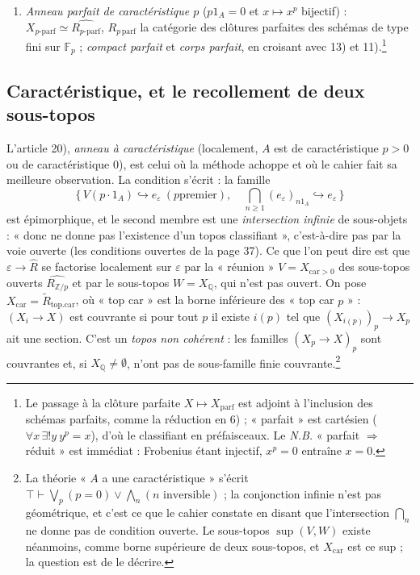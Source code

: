 \documentclass[11pt,a4paper]{article}
\begin{document}
\begin{enumerate}
\item[17)--19)] \emph{Anneau parfait de caractéristique $p$} ($p1_{A} = 0$
et $x \mapsto x^{p}$ bijectif) : $X_{p\text{-parf}} \simeq \widehat{R_{p\text{-parf}}}$,
$R_{p\,\mathrm{parf}}$ la catégorie des clôtures parfaites des schémas de
type fini sur $\mathbb{F}_{p}$ ; \emph{compact parfait} et \emph{corps
parfait}, en croisant avec 13) et 11).\footnote{Le passage à la clôture
parfaite $X \mapsto X_{\mathrm{parf}}$ est adjoint à l'inclusion des schémas
parfaits, comme la réduction en 6) ; « parfait » est cartésien
($\forall x\, \exists! y\ y^{p} = x$), d'où le classifiant en préfaisceaux.
Le \emph{N.B.} « parfait $\Rightarrow$ réduit » est immédiat : Frobenius
étant injectif, $x^{p} = 0$ entraîne $x = 0$.}
\end{enumerate}

\subsection*{Caractéristique, et le recollement de deux sous-topos}

L'article 20), \emph{anneau à caractéristique} (localement, $A$ est de
caractéristique $p > 0$ ou de caractéristique $0$), est celui où la
méthode achoppe et où le cahier fait sa meilleure observation. La
condition s'écrit : la famille
\[
\bigl\{\, V(p \cdot 1_{A}) \hookrightarrow e_{\varepsilon}\ (p \text{
premier}),\quad \textstyle\bigcap_{n \geqslant 1} (e_{\varepsilon})_{n1_{A}}
\hookrightarrow e_{\varepsilon} \,\bigr\}
\]
est épimorphique, et le second membre est une \emph{intersection infinie}
de sous-objets : « donc ne donne pas l'existence d'un topos classifiant »,
c'est-à-dire pas par la voie ouverte (les conditions ouvertes de la page
37). Ce que l'on peut dire est que $\varepsilon \to \widehat{R}$ se factorise
localement sur $\varepsilon$ par la « réunion » $V = X_{\mathrm{car} > 0}$
des sous-topos ouverts $\widehat{R_{\mathbb{Z}/p}}$ et par le sous-topos $W =
X_{\mathbb{Q}}$, qui n'est pas ouvert. On pose $X_{\mathrm{car}} =
\widetilde{R}_{\mathrm{top.car}}$, où « top car » est la borne inférieure
des « top car $p$ » : $(X_{i} \to X)$ est couvrante si pour tout $p$ il
existe $i(p)$ tel que $(X_{i(p)})_{p} \to X_{p}$ ait une section. C'est un
\emph{topos non cohérent} : les familles $(X_{p} \to X)_{p}$ sont
couvrantes et, si $X_{\mathbb{Q}} \neq \emptyset$, n'ont pas de
sous-famille finie couvrante.\footnote{La théorie « $A$ a une
caractéristique » s'écrit $\top \vdash \bigvee_{p} (p = 0) \vee
\bigwedge_{n} (n \text{ inversible})$ ; la conjonction infinie n'est pas
géométrique, et c'est ce que le cahier constate en disant que
l'intersection $\bigcap_{n}$ ne donne pas de condition ouverte. Le
sous-topos $\sup(V, W)$ existe néanmoins, comme borne supérieure de deux
sous-topos, et $X_{\mathrm{car}}$ est ce sup ; la question est de le
décrire.}
\end{document}
